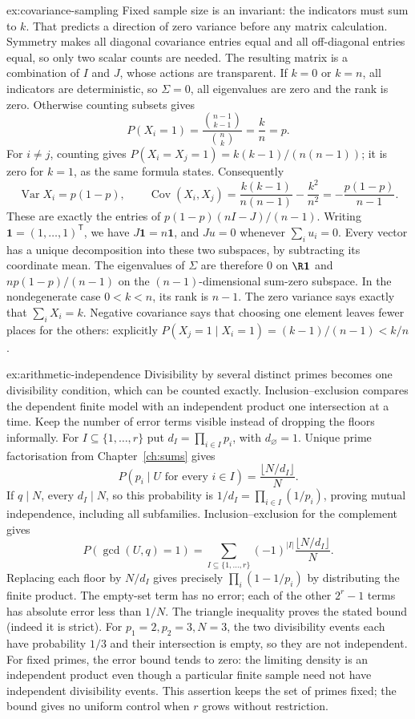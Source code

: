 \begin{solution}{ex:covariance-sampling}
\idea Fixed sample size is an invariant: the indicators must sum to $k$.
That predicts a direction of zero variance before any matrix calculation.
Symmetry makes all diagonal covariance entries equal and all off-diagonal
entries equal, so only two scalar counts are needed. The resulting matrix is
a combination of $I$ and $J$, whose actions are transparent.
\writeup If $k=0$ or $k=n$, all indicators are deterministic, so $\Sigma=0$,
all eigenvalues are zero and the rank is zero. Otherwise counting subsets gives
\[
 P(X_i=1)=\frac{\binom{n-1}{k-1}}{\binom nk}=\frac kn=p.
\]
For $i\ne j$, counting gives
$P(X_i=X_j=1)=k(k-1)/(n(n-1))$; it is zero for $k=1$, as the same formula
states. Consequently
\[
 \operatorname{Var}X_i=p(1-p),\qquad
 \operatorname{Cov}(X_i,X_j)
 =\frac{k(k-1)}{n(n-1)}-\frac{k^2}{n^2}
 =-\frac{p(1-p)}{n-1}.
\]
These are exactly the entries of $p(1-p)(nI-J)/(n-1)$.
Writing $\boldsymbol1=(1,\ldots,1)^{\mathsf T}$, we have
$J\boldsymbol1=n\boldsymbol1$, and $Ju=0$ whenever $\sum_i u_i=0$.
Every vector has a unique decomposition into these two subspaces, by subtracting
its coordinate mean. The eigenvalues of $\Sigma$ are therefore $0$ on
$\R\boldsymbol1$ and $np(1-p)/(n-1)$ on the $(n-1)$-dimensional
sum-zero subspace. In the nondegenerate case $0<k<n$, its rank is $n-1$.
The zero variance says exactly that $\sum_iX_i=k$. Negative covariance says
that choosing one element leaves fewer places for the others: explicitly
$P(X_j=1\mid X_i=1)=(k-1)/(n-1)<k/n$.
\end{solution}

\begin{solution}{ex:arithmetic-independence}
\idea Divisibility by several distinct primes becomes one divisibility condition,
which can be counted exactly. Inclusion--exclusion compares the dependent finite
model with an independent product one intersection at a time. Keep the number
of error terms visible instead of dropping the floors informally.
\writeup For $I\subseteq\{1,\ldots,r\}$ put $d_I=\prod_{i\in I}p_i$,
with $d_\varnothing=1$. Unique prime factorisation from
Chapter~\ref{ch:sums} gives
\[
 P(p_i\mid U\text{ for every }i\in I)
 =\frac{\lfloor N/d_I\rfloor}{N}.
\]
If $q\mid N$, every $d_I\mid N$, so this probability is
$1/d_I=\prod_{i\in I}(1/p_i)$, proving mutual independence, including all
subfamilies. Inclusion--exclusion for the complement gives
\[
 P(\gcd(U,q)=1)
 =\sum_{I\subseteq\{1,\ldots,r\}}(-1)^{|I|}
       \frac{\lfloor N/d_I\rfloor}{N}.
\]
Replacing each floor by $N/d_I$ gives precisely
$\prod_i(1-1/p_i)$ by distributing the finite product. The empty-set term
has no error; each of the other $2^r-1$ terms has absolute error less than
$1/N$. The triangle inequality proves the stated bound (indeed it is strict).
For $p_1=2,p_2=3,N=3$, the two divisibility events each have probability $1/3$
and their intersection is empty, so they are not independent. For fixed primes,
the error bound tends to zero: the limiting density is an independent product
even though a particular finite sample need not have independent divisibility
events. This assertion keeps the set of primes fixed; the bound gives no uniform
control when $r$ grows without restriction.
\end{solution}

